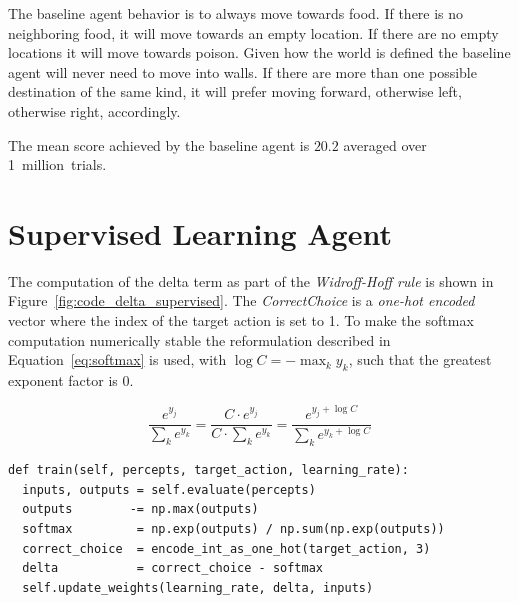 \documentclass[paper=a4, fontsize=10pt]{scrartcl}
\begin{document}
\begin{multicols}{2}
The baseline agent behavior is to always move towards food. If there is no neighboring food, it will move towards an empty location. If there are no empty locations it will move towards poison. Given how the world is defined the baseline agent will never need to move into walls. If there are more than one possible destination of the same kind, it will prefer moving forward, otherwise left, otherwise right, accordingly.

The mean score achieved by the baseline agent is $20.2$ averaged over 1~million~trials.

\vspace{-0.3cm}
\section*{Supervised Learning Agent}

The computation of the delta term as part of the \textit{Widroff-Hoff rule} is shown in Figure~\ref{fig:code_delta_supervised}. The \textit{CorrectChoice} is a \textit{one-hot encoded} vector where the index of the target action is set to 1. To make the softmax computation numerically stable the reformulation described in Equation~\ref{eq:softmax} is used, with ${\log C = -\max_k y_k}$, such that the greatest exponent factor is 0.

\begin{equation}
\frac{e^{y_j}}{\sum_k e^{y_k}} = \frac{C \cdot e^{y_j}}{C \cdot \sum_k e^{y_k}} = \frac{e^{y_j + \log C}}{\sum_k e^{y_k + \log C}}
\label{eq:softmax}
\end{equation}

{
\footnotesize
\begin{verbatim}
def train(self, percepts, target_action, learning_rate):
  inputs, outputs = self.evaluate(percepts)
  outputs        -= np.max(outputs)
  softmax         = np.exp(outputs) / np.sum(np.exp(outputs))
  correct_choice  = encode_int_as_one_hot(target_action, 3)
  delta           = correct_choice - softmax
  self.update_weights(learning_rate, delta, inputs)
\end{verbatim}
\vspace*{-3mm}
\label{fig:code_delta_supervised}
}

\vspace{-0.3cm}

\end{multicols}
\end{document}
